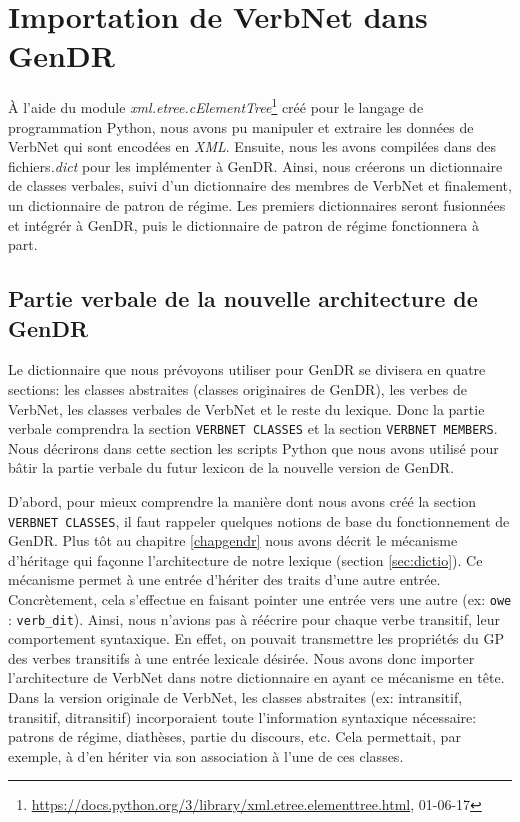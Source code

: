 \chapter{Importation de VerbNet dans GenDR}\label{ch:python}


À l'aide du module \emph{xml.etree.cElementTree}\footnote{\url{https://docs.python.org/3/library/xml.etree.elementtree.html}, 01-06-17} créé pour le langage de programmation Python, nous avons pu manipuler et extraire les données de VerbNet qui sont encodées en \emph{XML}. Ensuite, nous les avons compilées dans des fichiers\emph{.dict} pour les implémenter à GenDR. Ainsi, nous créerons un dictionnaire de classes verbales, suivi d'un dictionnaire des membres de VerbNet et finalement, un dictionnaire de patron de régime. Les premiers dictionnaires seront fusionnées et intégrér à GenDR, puis le dictionnaire de patron de régime fonctionnera à part.
 
\section{Partie verbale de la nouvelle architecture de GenDR}

Le dictionnaire que nous prévoyons utiliser pour GenDR se divisera en quatre sections: les classes abstraites (classes originaires de GenDR), les verbes de VerbNet, les classes verbales de VerbNet et le reste du lexique. Donc la partie verbale comprendra la section \texttt{VERBNET CLASSES} et la section \texttt{VERBNET MEMBERS}. Nous décrirons dans cette section les scripts Python que nous avons utilisé pour bâtir la partie verbale du futur lexicon de la nouvelle version de GenDR.

D'abord, pour mieux comprendre la manière dont nous avons créé la section \texttt{VERBNET CLASSES}, il faut rappeler quelques notions de base du fonctionnement de GenDR. Plus tôt au chapitre \ref{chapgendr} nous avons décrit le mécanisme d'héritage qui façonne l'architecture de notre lexique (section \ref{sec:dictio}). Ce mécanisme permet à une entrée d'hériter des traits d'une autre entrée. Concrètement, cela s'effectue en faisant pointer une entrée vers une autre (ex: \texttt{owe} : \texttt{verb\_dit}). Ainsi, nous n'avions pas à réécrire pour chaque verbe transitif, leur comportement syntaxique. En effet, on pouvait transmettre les propriétés du \ac{GP} des verbes transitifs à une entrée lexicale désirée. Nous avons donc importer l'architecture de VerbNet dans notre dictionnaire en ayant ce mécanisme en tête. Dans la version originale de VerbNet, les classes abstraites (ex: intransitif, transitif, ditransitif) incorporaient toute l'information syntaxique nécessaire: patrons de régime, diathèses, partie du discours, etc. Cela permettait, par exemple, à  d'en hériter via son association à l'une de ces classes.  

